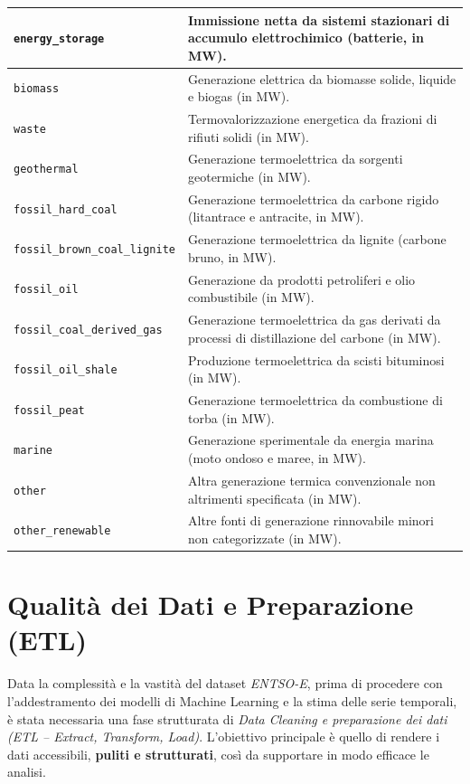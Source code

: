 \begin{xltabular}{\textwidth}{|l|X|}
\texttt{energy\_storage} & Immissione netta da sistemi stazionari di accumulo elettrochimico (batterie, in MW). \\ \hline
\texttt{biomass} & Generazione elettrica da biomasse solide, liquide e biogas (in MW). \\ \hline
\texttt{waste} & Termovalorizzazione energetica da frazioni di rifiuti solidi (in MW). \\ \hline
\texttt{geothermal} & Generazione termoelettrica da sorgenti geotermiche (in MW). \\ \hline
\texttt{fossil\_hard\_coal} & Generazione termoelettrica da carbone rigido (litantrace e antracite, in MW). \\ \hline
\texttt{fossil\_brown\_coal\_lignite} & Generazione termoelettrica da lignite (carbone bruno, in MW). \\ \hline
\texttt{fossil\_oil} & Generazione da prodotti petroliferi e olio combustibile (in MW). \\ \hline
\texttt{fossil\_coal\_derived\_gas} & Generazione termoelettrica da gas derivati da processi di distillazione del carbone (in MW). \\ \hline
\texttt{fossil\_oil\_shale} & Produzione termoelettrica da scisti bituminosi (in MW). \\ \hline
\texttt{fossil\_peat} & Generazione termoelettrica da combustione di torba (in MW). \\ \hline
\texttt{marine} & Generazione sperimentale da energia marina (moto ondoso e maree, in MW). \\ \hline
\texttt{other} & Altra generazione termica convenzionale non altrimenti specificata (in MW). \\ \hline
\texttt{other\_renewable} & Altre fonti di generazione rinnovabile minori non categorizzate (in MW). \\ \hline
\end{xltabular}
\renewcommand{\arraystretch}{1.0}

\section{Qualità dei Dati e Preparazione (ETL)}
Data la complessità e la vastità del dataset \textit{ENTSO-E}, prima di procedere con l'addestramento dei modelli di Machine Learning e la stima delle serie temporali, è stata necessaria una fase strutturata di \textit{Data Cleaning e preparazione dei dati (ETL -- Extract, Transform, Load)}. L'obiettivo principale è quello di rendere i dati accessibili, \textbf{puliti e strutturati}, così da supportare in modo efficace le analisi.

